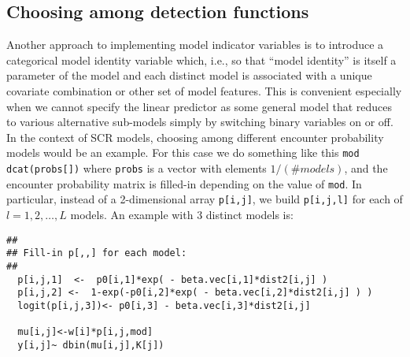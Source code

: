 \subsection{Choosing among detection functions}



Another approach to implementing model indicator variables is to
introduce a categorical model identity variable which, i.e., so that
``model identity'' is itself a parameter of the model and each
distinct model is associated with a unique covariate combination or
other set of model features. This is convenient especially when we
cannot specify the linear predictor as some general model that reduces
to various alternative sub-models simply by switching binary variables
on or off. In the context of SCR models, choosing among different
encounter probability models would be an example.  For this case we do
something like this \mbox{\tt mod ~  dcat(probs[])}
where \mbox{\tt probs} is a vector with elements $1/(\# models)$, and
the encounter probability matrix is filled-in depending on the value 
 of \mbox{\tt mod}. 
In particular, instead of a 2-dimensional array
 \mbox{\tt p[i,j]},  we build \mbox{\tt p[i,j,l]} for each of
$l=1,2,\ldots,L$ models. An example with 3 distinct models is:
{\small
\begin{verbatim}
##
## Fill-in p[,,] for each model:
##
  p[i,j,1]  <-  p0[i,1]*exp( - beta.vec[i,1]*dist2[i,j] )
  p[i,j,2] <-  1-exp(-p0[i,2]*exp( - beta.vec[i,2]*dist2[i,j] ) )
  logit(p[i,j,3])<- p0[i,3] - beta.vec[i,3]*dist2[i,j]

  mu[i,j]<-w[i]*p[i,j,mod]
  y[i,j]~ dbin(mu[i,j],K[j])
\end{verbatim}
}


